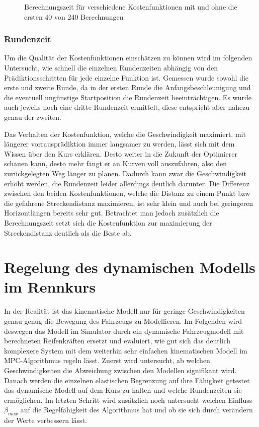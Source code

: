 \documentclass{like}
\begin{document}
\begin{figure}
	\centering
	 
	\caption{Berechnungszeit für verschiedene Kostenfunktionen mit und ohne die ersten 40 von 240 Berechnungen}
	\label{fig:computeCost}
\end{figure}

\subsubsection*{Rundenzeit}
Um die Qualität der Kostenfunktionen einschätzen zu können wird im folgenden Untersucht, wie schnell die einzelnen Rundenzeiten abhängig von den Prädiktionsschritten für jede einzelne Funktion ist.
Gemessen wurde sowohl die erste und zweite Runde, da in der ersten Runde die Anfangsbeschleunigung und die eventuell ungünstige Startposition die Rundenzeit beeinträchtigen. Es wurde auch jeweils noch eine dritte Rundenzeit ermittelt, diese entspricht aber nahezu genau der zweiten.

\begin{figure}
	\centering
	 
	\caption{}
	\label{fig:lapTimeKin}
\end{figure}

Das Verhalten der Kostenfunktion, welche die Geschwindigkeit maximiert, mit längerer vorrausprädiktion immer langsamer zu werden, lässt sich mit dem Wissen über den Kurs erklären. Desto weiter in die Zukunft der Optimierer schauen kann, desto mehr fängt er an Kurven voll auszufahren, also den zurückgelegten Weg länger zu planen. Dadurch kann zwar die Geschwindigkeit erhöht werden, die Rundenzeit leider allerdings deutlich darunter. 
Die Differenz zwischen den beiden Kostenfunktionen, welche die Distanz zu einem Punkt bzw die gefahrene Streckendistanz maximieren, ist sehr klein und auch bei geringeren Horizontlängen bereits sehr gut. Betrachtet man jedoch zusätzlich die Berechnungszeit setzt sich die Kostenfunktion zur maximierung der Streckendistanz deutlich als die Beste ab.



\section{Regelung des dynamischen Modells im Rennkurs}
In der Realität ist das kinematische Modell nur für geringe Geschwindigkeiten genau genug die Bewegung des Fahrzeugs zu Modellieren. Im Folgenden wird deswegen das Modell im Simulator durch ein dynamische Fahrzeugmodell mit berechneten Reifenkräften ersetzt und evaluiert, wie gut sich das deutlich komplexere System mit dem weiterhin sehr einfachen kinematischen Modell im \ac{MPC}-Algorithmus regeln lässt. 
Zuerst wird untersucht, ab welchen Geschwindigkeiten die Abweichung zwischen den Modellen signifikant wird. Danach werden die einzelnen elastischen Begrenzung auf ihre Fähigkeit getestet das dynamische Modell auf dem Kurs zu halten und welche Rundenzeiten sie ermöglichen. Im letzten Schritt wird zusätzlich noch untersucht welchen Einfluss $\beta_{max}$ auf die Regelfähigkeit des Algorithmus hat und ob sie sich durch verändern der Werte verbessern lässt. 
\end{document}
